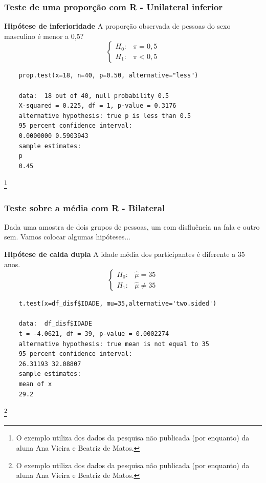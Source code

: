 \documentclass[graphics,14pt]{beamer}
\newcommand{\lfr}[1]{\let\thefootnote\relax\footnote{\hspace{0.6cm}\vspace{1.25cm} #1}}
\begin{document}
\begin{frame}[t,fragile=singleslide]
\frametitle{Teste de uma proporção com R - Unilateral inferior}
	\textbf{Hipótese de inferioridade}
	A proporção observada de pessoas do sexo masculino é menor a 0,5?
	\begin{equation*}
	\left\{ \begin{array}{cl}
	H_0: & \pi = 0,5 \\
	H_1: & \pi < 0,5
	\end{array}\right.
	\end{equation*}
	
	\begin{lstlisting}
	prop.test(x=18, n=40, p=0.50, alternative="less")
	
	data:  18 out of 40, null probability 0.5
	X-squared = 0.225, df = 1, p-value = 0.3176
	alternative hypothesis: true p is less than 0.5
	95 percent confidence interval:
	0.0000000 0.5903943
	sample estimates:
	p 
	0.45 
	\end{lstlisting}

\lfr{O exemplo utiliza dos dados da pesquisa não publicada (por enquanto) da aluna Ana Vieira e Beatriz de Matos.}
\end{frame}
\begin{frame}[t,fragile=singleslide]
\frametitle{Teste sobre a média com R - Bilateral}
	Dada uma amostra de dois grupos de pessoas, um com disfluência na fala e outro sem. Vamos colocar algumas hipóteses...
	
	\textbf{Hipótese de calda dupla}
	A idade média dos participantes é diferente a 35 anos.
	\begin{equation*}
	\left\{ \begin{array}{cl}
	H_0: & \hat{\mu} = 35 \\
	H_1: & \hat{\mu} \neq 35
	\end{array}\right.
	\end{equation*}
	
	\begin{lstlisting}
	t.test(x=df_disf$IDADE, mu=35,alternative='two.sided')
	
	data:  df_disf$IDADE
	t = -4.0621, df = 39, p-value = 0.0002274
	alternative hypothesis: true mean is not equal to 35
	95 percent confidence interval:
	26.31193 32.08807
	sample estimates:
	mean of x 
	29.2  
	\end{lstlisting}
	
	\lfr{O exemplo utiliza dos dados da pesquisa não publicada (por enquanto) da aluna Ana Vieira e Beatriz de Matos.}

\end{frame}
\end{document}
